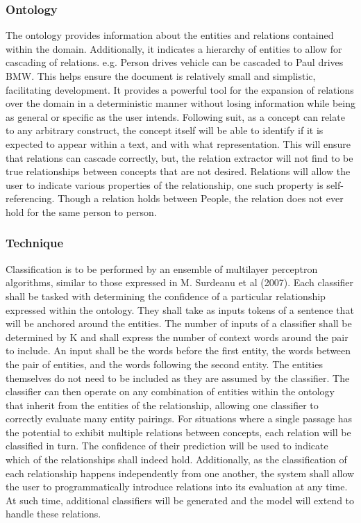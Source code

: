 \documentclass[11pt]{article} %
\begin{document}
\subsubsection{Ontology}

The ontology provides information about the entities and relations contained within the domain. Additionally, it indicates a hierarchy of entities to allow for cascading of relations. e.g. Person drives vehicle can be cascaded to Paul drives BMW. This helps ensure the document is relatively small and simplistic, facilitating development. It provides a powerful tool for the expansion of relations over the domain in a deterministic manner without losing information while being as general or specific as the user intends. Following suit, as a concept can relate to any arbitrary construct, the concept itself will be able to identify if it is expected to appear within a text, and with what representation. This will ensure that relations can cascade correctly, but, the relation extractor will not find to be true relationships between concepts that are not desired. Relations will allow the user to indicate various properties of the relationship, one such property is self-referencing. Though a relation holds between People, the relation does not ever hold for the same person to person.

\subsubsection{Technique}

Classification is to be performed by an ensemble of multilayer perceptron algorithms, similar to those expressed in M. Surdeanu et al (2007). Each classifier shall be tasked with determining the confidence of a particular relationship expressed within the ontology. They shall take as inputs tokens of a sentence that will be anchored around the entities. The number of inputs of a classifier shall be determined by K and shall express the number of context words around the pair to include. An input shall be the words before the first entity, the words between the pair of entities, and the words following the second entity. The entities themselves do not need to be included as they are assumed by the classifier. The classifier can then operate on any combination of entities within the ontology that inherit from the entities of the relationship, allowing one classifier to correctly evaluate many entity pairings. For situations where a single passage has the potential to exhibit multiple relations between concepts, each relation will be classified in turn. The confidence of their prediction will be used to indicate which of the relationships shall indeed hold. Additionally, as the classification of each relationship happens independently from one another, the system shall allow the user to programmatically introduce relations into its evaluation at any time. At such time, additional classifiers will be generated and the model will extend to handle these relations.
\end{document}
